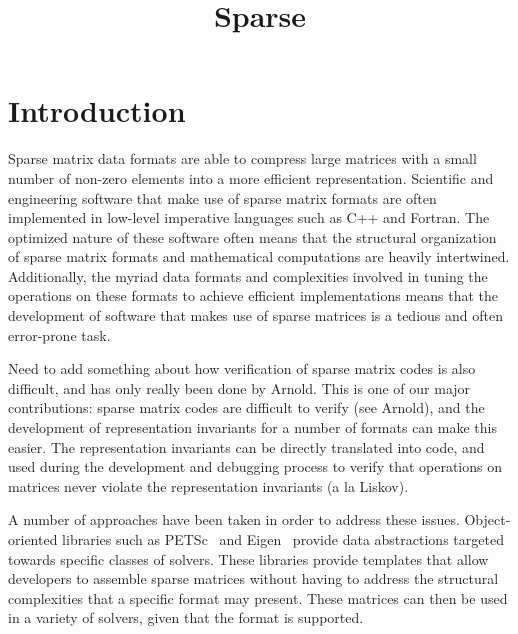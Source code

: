 \documentclass[11pt,conference]{IEEEtran}
\begin{document}
\title{Sparse}
\author{
  \and
}

\maketitle

\section{Introduction}

Sparse matrix data formats are able to compress large matrices with a small number of non-zero elements into a more efficient representation.  
Scientific and engineering software that make use of sparse matrix formats are often implemented in low-level imperative languages such as C++ and Fortran.  The optimized nature of these software often means that the structural organization of sparse matrix formats and mathematical computations are heavily intertwined.  Additionally, the myriad data formats and complexities involved in tuning the operations on these formats to achieve efficient implementations means that the development of software that makes use of sparse matrices is a tedious and often error-prone task.

Need to add something about how verification of sparse matrix codes is also difficult, and has only really been done by Arnold.  This is one of our major contributions: sparse matrix codes are difficult to verify (see Arnold), and the development of representation invariants for a number of formats can make this easier.  The representation invariants can be directly translated into code, and used during the development and debugging process to verify that operations on matrices never violate the representation invariants (a la Liskov).

A number of approaches have been taken in order to address these issues.  Object-oriented libraries such as PETSc~\cite{petsc2019} and Eigen~\cite{eigenweb2010} provide data abstractions targeted towards specific classes of solvers.  These libraries provide templates that allow developers to assemble sparse matrices without having to address the structural complexities that a specific format may present.  These matrices can then be used in a variety of solvers, given that the format is supported.
\end{document}
